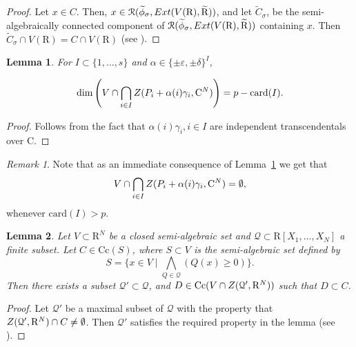 \documentclass[10pt]{amsart}
\newtheorem{lemma}{Lemma}[section]
\theoremstyle{definition}
\theoremstyle{remark}
\newtheorem{remark}{Remark}
\numberwithin{equation}{section}
\newcommand {\R} {\mathrm{R}}
\newcommand {\C}     {\mathrm{C}}
\newcommand {\ZZ} {{\rm Z}}
\newcommand {\RR} {{\mathcal R}}
\newcommand {\eps} {{\varepsilon}}
\newcommand {\E} {{\rm Ext}}
\newcommand{\card}{\mathrm{card}}
\newcommand{\Cc}{\mathrm{Cc}}
\begin{document}
\begin{proof}
Let $x \in C$. Then, $x \in \RR(\widetilde{\phi}_\sigma,\E(V(\R),\widetilde{\R}))$, and
let $\widetilde{C}_\sigma$, be the semi-algebraically connected
component of $\RR(\widetilde{\phi}_\sigma,\E(V(\R),\widetilde{\R}))$
containing $x$.
Then 
$\widetilde{C}_\sigma \cap V(\R) = C \cap V(\R)$
(see \cite[Proposition 13.7]{BPRbook2}).
\end{proof}

\begin{lemma}
\label{lem:main:ordered:5}
    For $I \subset \{1,\ldots,s\}$ and
    $\alpha \in \{\pm \eps, \pm \delta\}^I$,
    
    \[
    \dim \left(V \cap \bigcap_{i \in I} \ZZ(P_i + \alpha(i)  \gamma_i,\C^N)\right) = p - \card(I).
    \]
    
\end{lemma}

\begin{proof}
    Follows from the fact that $\alpha(i)\gamma_i, i \in I$ are independent transcendentals over $\C$.
\end{proof}

\begin{remark}
    \label{rem:lem:main:ordered:5}
    Note that as an immediate consequence of Lemma~\ref{lem:main:ordered:5} we get that
    \[
    V \cap \bigcap_{i \in I} \ZZ(P_i + \alpha(i)  \gamma_i,\C^N) = \emptyset,
    \]
    whenever $\card(I) > p$.
\end{remark}
\begin{lemma}
\label{lem:main:ordered:6}
    Let $V \subset \R^N$ be a closed semi-algebraic set and $\mathcal{Q} \subset \R[X_1,\ldots,X_N]$ a finite subset. Let $C \in \Cc(S)$, where $S \subset V$  is the semi-algebraic set defined by
    \[
    S = 
    \{x \in V \mid \bigwedge_{Q \in \mathcal{Q}} (Q(x) \geq 0)
    \}. 
    \]
    Then there exists a subset $\mathcal{Q}' \subset \mathcal{Q}$, and
    $D \in \Cc(V \cap \ZZ(\mathcal{Q}',\R^N))$ such that $D \subset C$.
\end{lemma}

\begin{proof}
Let $\mathcal{Q}'$ be a maximal subset of $\mathcal{Q}$ with the property that  $\ZZ(\mathcal{Q}',\R^N) \cap C \neq \emptyset$. Then
$\mathcal{Q}'$ satisfies the required property in the lemma (see \cite[Proposition 13.1]{BPRbook2}). 
\end{proof}
\end{document}
